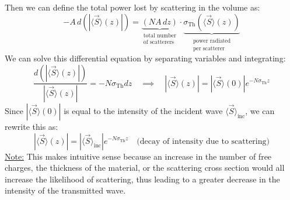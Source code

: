 \documentclass[12pt]{article}
\begin{document}
Then we can define the total power lost by scattering in the volume as:
\[
- A\, d(|\langle \vec{S} \rangle(z)|)
= \underbrace{(N A\, dz)}_{\substack{\text{total number} \\ \text{of scatterers}}}
\cdot
\underbrace{\sigma_{\text{Th}} (\langle \vec{S} \rangle(z))}_{\substack{\text{power radiated} \\ \text{per scatterer}}}
\]
We can solve this differential equation by separating variables and integrating:
\[\frac{d(|\langle \vec{S} \rangle(z)|)}{|\langle \vec{S} \rangle(z)|} = - N \sigma_{\text{Th}} dz\quad\implies\quad |\langle \vec{S} \rangle(z)| = |\langle \vec{S} \rangle(0)| e^{- N \sigma_{\text{Th}} z}\]
Since $|\langle \vec{S} \rangle(0)|$ is equal to the intensity of the incident wave $\langle \vec{S} \rangle_{\text{inc}}$, we can rewrite this as:
\[\boxed{|\langle \vec{S} \rangle(z)| = |\langle \vec{S} \rangle_{\text{inc}}| e^{- N \sigma_{\text{Th}} z} \quad \text{(decay of intensity due to scattering)}}\]
\underline{Note:} This makes intuitive sense because an increase in the number of free charges, the thickness of the material, or the scattering cross section would all increase the likelihood of scattering, thus leading to a greater decrease in the intensity of the transmitted wave.
\end{document}
